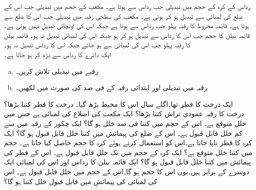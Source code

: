 رداس  کے کرہ کے حجم  میں تبدیلی جب رداس  سے  ہوتا ہے۔
مکعب کے حجم  میں تبدیلی جب اس کے ضلع کی لمبائی  سے تبدیل ہو کر  ہوتی ہے۔
مکعب کی سطحی رقبہ میں تبدیلی جب اس کا ضلع  سے  ہوتا ہے۔ 
قائمہ مخروط کا رقبہ پہلو  جب رداس  سے  ہوتا ہے جبکہ اس کی اونچائی  تبدیل نہیں ہوتی ہے۔
قائمہ بیلن کا حجم جب اس کا رداس  سے تبدیل ہو کر  ہو جبکہ اس کی لمبائی  تبدیل نہ ہو۔
قائمہ بیلن کا رقبہ پہلو  جب اس کی لمبائی  سے  ہو جائے جبکہ اس کا رداس تبدیل نہ ہو۔ 
\\
ایک دائرے کا رداس  سے بڑھ کر  ہو جاتا ہے۔
\begin{enumerate}[a.]
\item
رقبے میں تبدیلی تلاش کریں۔
\item
رقبہ میں تبدیلی اور ابتدائی رقبہ کے فی صد کی صورت میں لکھیں۔
\end{enumerate}
ایک درخت کا قطر  تھا۔اگلے سال اس کا محیط  بڑھ گیا۔ درخت کا قطر کتنا بڑھا؟ درخت کا رقبہ عمودی تراش کتنا بڑھا؟
ایک مکعب کی اضلاع کی لمبائی  ہے جس میں  خلل متوقع ہے۔ اس کے حجم میں کتنا فی صد خلل ہو گا؟
ایک چکور کے رقبہ میں  سے کم  خلل قابل قبول ہے۔ اس کے ضلع کی پیمائش میں کتنا خلل قابل قبول ہو گا؟
ایک کرہ کا قطر  ناپا جاتا ہے۔اس کو استعمال کرتے ہوئے کرہ کا حجم حاصل کیا جاتا ہے۔ حجم میں کتنا خلل متوقع ہے؟
ایک کرہ کے حجم میں  تک خلل قابل قبول ہے۔ اس کے قطر کی پیمائش میں کتنا خلل قابل قبول ہو گا؟ 
ایک قائمہ بیلن کا رداس اور اس کی لمبائی ایک دوسرے کے برابر ہیں۔یوں اس کا حجم  ہو گا۔اس کے حجم میں  خلل قابل قبول ہے۔ اس کی لمبائی کی پیمائش میں قابل قبول خلل کتنا ہو گا؟
